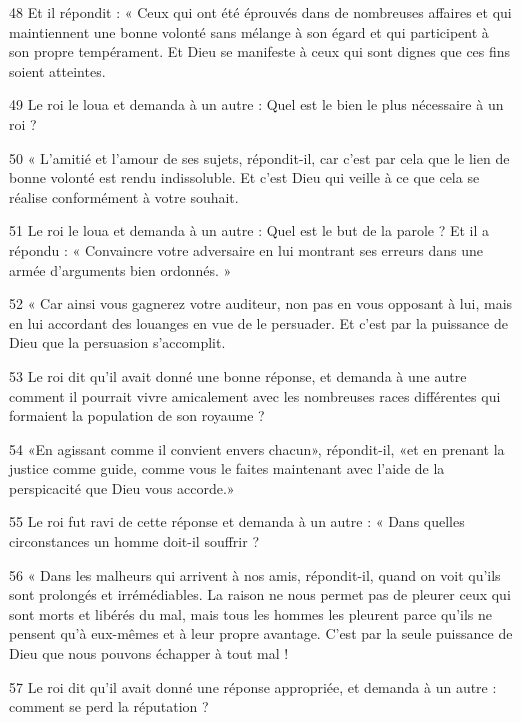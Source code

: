 \par 48 Et il répondit : « Ceux qui ont été éprouvés dans de nombreuses affaires et qui maintiennent une bonne volonté sans mélange à son égard et qui participent à son propre tempérament. Et Dieu se manifeste à ceux qui sont dignes que ces fins soient atteintes.

\par 49 Le roi le loua et demanda à un autre : Quel est le bien le plus nécessaire à un roi ?

\par 50 « L'amitié et l'amour de ses sujets, répondit-il, car c'est par cela que le lien de bonne volonté est rendu indissoluble. Et c'est Dieu qui veille à ce que cela se réalise conformément à votre souhait.

\par 51 Le roi le loua et demanda à un autre : Quel est le but de la parole ? Et il a répondu : « Convaincre votre adversaire en lui montrant ses erreurs dans une armée d'arguments bien ordonnés. »

\par 52 « Car ainsi vous gagnerez votre auditeur, non pas en vous opposant à lui, mais en lui accordant des louanges en vue de le persuader. Et c'est par la puissance de Dieu que la persuasion s'accomplit.

\par 53 Le roi dit qu'il avait donné une bonne réponse, et demanda à une autre comment il pourrait vivre amicalement avec les nombreuses races différentes qui formaient la population de son royaume ?

\par 54 «En agissant comme il convient envers chacun», répondit-il, «et en prenant la justice comme guide, comme vous le faites maintenant avec l'aide de la perspicacité que Dieu vous accorde.»

\par 55 Le roi fut ravi de cette réponse et demanda à un autre : « Dans quelles circonstances un homme doit-il souffrir ?

\par 56 « Dans les malheurs qui arrivent à nos amis, répondit-il, quand on voit qu'ils sont prolongés et irrémédiables. La raison ne nous permet pas de pleurer ceux qui sont morts et libérés du mal, mais tous les hommes les pleurent parce qu'ils ne pensent qu'à eux-mêmes et à leur propre avantage. C'est par la seule puissance de Dieu que nous pouvons échapper à tout mal !

\par 57 Le roi dit qu'il avait donné une réponse appropriée, et demanda à un autre : comment se perd la réputation ?

